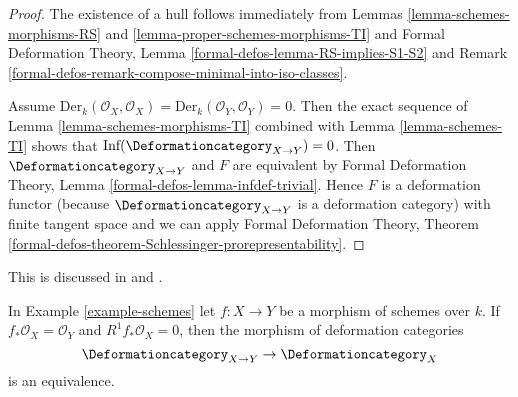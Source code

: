 \begin{proof}
The existence of a hull follows immediately from
Lemmas \ref{lemma-schemes-morphisms-RS} and
\ref{lemma-proper-schemes-morphisms-TI} and
Formal Deformation Theory, Lemma \ref{formal-defos-lemma-RS-implies-S1-S2}
and Remark \ref{formal-defos-remark-compose-minimal-into-iso-classes}.

\medskip\noindent
Assume $\text{Der}_k(\mathcal{O}_X, \mathcal{O}_X) =
\text{Der}_k(\mathcal{O}_Y, \mathcal{O}_Y) = 0$. Then
the exact sequence of Lemma \ref{lemma-schemes-morphisms-TI}
combined with Lemma \ref{lemma-schemes-TI}
shows that $\text{Inf}(\Deformationcategory_{X \to Y}) = 0$.
Then $\Deformationcategory_{X \to Y}$ and $F$ are equivalent by
Formal Deformation Theory, Lemma \ref{formal-defos-lemma-infdef-trivial}.
Hence $F$ is a deformation functor (because
$\Deformationcategory_{X \to Y}$ is a
deformation category) with finite tangent space and we can apply
Formal Deformation Theory, Theorem
\ref{formal-defos-theorem-Schlessinger-prorepresentability}.
\end{proof}

\begin{lemma}
\label{lemma-schemes-morphisms-smooth-to-base}
\begin{reference}
This is discussed in \cite[Section 5.3]{Ravi-Murphys-Law} and
\cite[Theorem 3.3]{Ran-deformations}.
\end{reference}
In Example \ref{example-schemes} let $f : X \to Y$ be a morphism of schemes
over $k$. If $f_*\mathcal{O}_X = \mathcal{O}_Y$ and $R^1f_*\mathcal{O}_X = 0$,
then the morphism of deformation categories
$$
\Deformationcategory_{X \to Y} \to \Deformationcategory_X
$$
is an equivalence.
\end{lemma}

